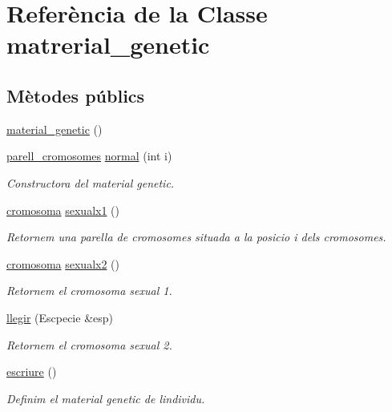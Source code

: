\hypertarget{classmatrerial__genetic}{}\section{Referència de la Classe matrerial\+\_\+genetic}
\label{classmatrerial__genetic}
\subsection*{Mètodes públics}
\begin{DoxyCompactItemize}
\item 
\hyperlink{classmatrerial__genetic_ad477d416cc4fa1babb97c70f936d92a5}{material\+\_\+genetic} ()
\item 
\hyperlink{classparell__cromosomes}{parell\+\_\+cromosomes} \hyperlink{classmatrerial__genetic_a7dd3b921332743dbe09f8212695cfc04}{normal} (int i)
\begin{DoxyCompactList}\small\item\em Constructora del material genetic. \end{DoxyCompactList}\item 
\hyperlink{classcromosoma}{cromosoma} \hyperlink{classmatrerial__genetic_a837ea787960ae9a5124b883df81e6fec}{sexualx1} ()
\begin{DoxyCompactList}\small\item\em Retornem una parella de cromosomes situada a la posicio i dels cromosomes. \end{DoxyCompactList}\item 
\hyperlink{classcromosoma}{cromosoma} \hyperlink{classmatrerial__genetic_a1ac242f8322bf0430102a263c3300cf8}{sexualx2} ()
\begin{DoxyCompactList}\small\item\em Retornem el cromosoma sexual 1. \end{DoxyCompactList}\item 
\hyperlink{classmatrerial__genetic_a30282ff258e0550e5449c6ba0542aff0}{llegir} (Escpecie \&esp)
\begin{DoxyCompactList}\small\item\em Retornem el cromosoma sexual 2. \end{DoxyCompactList}\item 
\hyperlink{classmatrerial__genetic_a4b2d00c6f920bee84eb8211b7622b2ef}{escriure} ()
\begin{DoxyCompactList}\small\item\em Definim el material genetic de l\textquotesingle{}individu. \end{DoxyCompactList}\end{DoxyCompactItemize}


